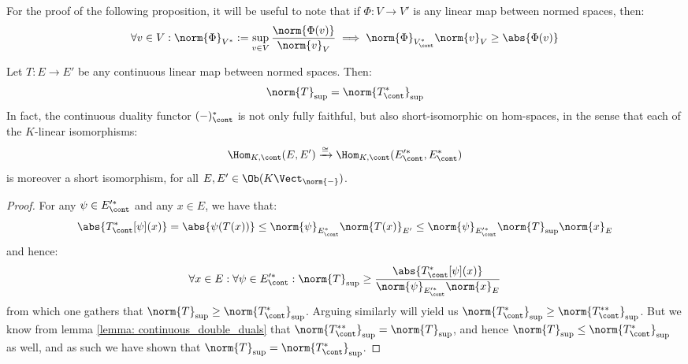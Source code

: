         For the proof of the following proposition, it will be useful to note that if $\Phi: V \to V'$ is any linear map between normed spaces, then:
            $$\forall v \in V: \norm{\Phi}_{V^*} := \sup_{v \in V} \frac{\norm{\Phi(v)}}{\norm{v}_V} \implies \norm{\Phi}_{V^*_{\cont}} \norm{v}_V \geq \abs{\Phi(v)}$$
        \begin{proposition} \label{prop: transposition_norms}
            Let $T: E \to E'$ be any continuous linear map between normed spaces. Then:
                $$\norm{T}_{\sup} = \norm{T^*_{\cont}}_{\sup}$$
            In fact, the continuous duality functor $(-)_{\cont}^*$ is not only fully faithful, but also short-isomorphic on hom-spaces, in the sense that each of the $K$-linear isomorphisms:
                $$\Hom_{K, \cont}(E, E') \xrightarrow[]{\cong} \Hom_{K, \cont}(E'^*_{\cont}, E^*_{\cont})$$
            is moreover a short isomorphism, for all $E, E' \in \Ob( K\-\Vect_{\norm{-}} )$.
        \end{proposition}
            \begin{proof}
                For any $\psi \in E'^*_{\cont}$ and any $x \in E$, we have that:
                    $$\abs{ T^*_{\cont}[\psi](x) } = \abs{\psi(T(x))} \leq \norm{\psi}_{E^*_{\cont}} \norm{T(x)}_{E'} \leq \norm{\psi}_{E'^*_{\cont}} \norm{T}_{\sup} \norm{x}_E$$
                and hence:
                    $$\forall x \in E: \forall \psi \in E'^*_{\cont}: \norm{T}_{\sup} \geq \frac{ \abs{ T^*_{\cont}[\psi](x) } }{\norm{\psi}_{E'^*_{\cont}} \norm{x}_E }$$
                from which one gathers that $\norm{T}_{\sup} \geq \norm{T^*_{\cont}}_{\sup}$. Arguing similarly will yield us $\norm{T^*_{\cont}}_{\sup} \geq \norm{T^{**}_{\cont}}_{\sup}$. But we know from lemma \ref{lemma: continuous_double_duals} that $\norm{T^{**}_{\cont}}_{\sup} = \norm{T}_{\sup}$, and hence $\norm{T}_{\sup} \leq \norm{T^*_{\cont}}_{\sup}$ as well, and as such we have shown that $\norm{T}_{\sup} = \norm{T^*_{\cont}}_{\sup}$.
            \end{proof}
            
